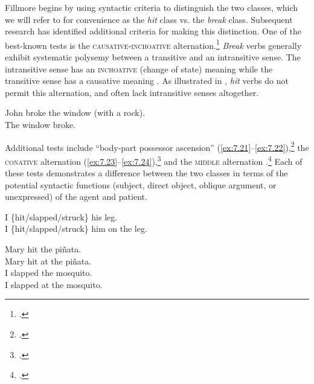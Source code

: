Fillmore begins by using syntactic criteria to distinguish the two classes, which we will refer to for convenience as the \textit{hit} class vs. the \textit{break} class. Subsequent research has identified additional criteria for making this distinction. One of the best-known tests is the \textsc{causative-inchoative} alternation.\footnote{\citet[122--123]{Fillmore1970}.} \textit{Break} verbs generally exhibit systematic polysemy between a transitive and an intransitive sense. The intransitive sense has an \textsc{inchoative} (change of state) meaning while the transitive sense has a causative meaning . As illustrated in , \textit{hit} verbs do not permit this alternation, and often lack intransitive senses altogether.


\ea \label{ex:7.19}
\ea  John broke the window (with a rock).\\
\ex  The window broke.
                       \z
\z

\ea \label{ex:7.20}
                       \z
\z


Additional tests include “body-part possessor ascension” (\ref{ex:7.21}--\ref{ex:7.22}),\footnote{\citet[126]{Fillmore1970}.} the \textsc{conative} alternation (\ref{ex:7.23}--\ref{ex:7.24}),\footnote{\citet{GuersselEtAl1985,Levin1993}.} and the \textsc{middle} alternation .\footnote{\citet{Fillmore1977,HaleKeyser1987,Levin1993}.} Each of these tests demonstrates a difference between the two classes in terms of the potential syntactic functions (subject, direct object, oblique argument, or unexpressed) of the agent and patient.


\ea \label{ex:7.21}
\ea  I \{hit/slapped/struck\} his leg.\\
\ex  I \{hit/slapped/struck\} him on the leg.
                       \z
\z

\ea \label{ex:7.22}
                       \z
\z

\ea \label{ex:7.23}
\ea  Mary hit the piñata.\\
\ex  Mary hit at the piñata.\\
\ex  I slapped the mosquito.\\
\ex  I slapped at the mosquito.
                       \z
\z

\ea \label{ex:7.24}
                       \z
\z

